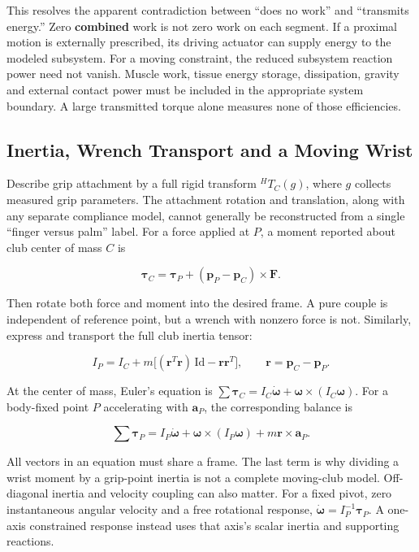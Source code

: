 \documentclass[
  11pt,
]{article}
\begin{document}
This resolves the apparent contradiction between ``does no work'' and
``transmits energy.'' Zero \textbf{combined} work is not zero work on
each segment. If a proximal motion is externally prescribed, its driving
actuator can supply energy to the modeled subsystem. For a moving
constraint, the reduced subsystem reaction power need not vanish. Muscle
work, tissue energy storage, dissipation, gravity and external contact
power must be included in the appropriate system boundary. A large
transmitted torque alone measures none of those efficiencies.

\subsection{Inertia, Wrench Transport and a Moving
Wrist}\label{inertia-wrench-transport-and-a-moving-wrist}

Describe grip attachment by a full rigid transform \({}^{H}T_C(g)\),
where \(g\) collects measured grip parameters. The attachment rotation
and translation, along with any separate compliance model, cannot
generally be reconstructed from a single ``finger versus palm'' label.
For a force applied at \(P\), a moment reported about club center of
mass \(C\) is

\[
\boldsymbol\tau_C=\boldsymbol\tau_P+
(\mathbf p_P-\mathbf p_C)\times\mathbf F.
\]

Then rotate both force and moment into the desired frame. A pure couple
is independent of reference point, but a wrench with nonzero force is
not. Similarly, express and transport the full club inertia tensor:

\[
I_P=I_C+m\big[(\mathbf r^T\mathbf r)\,\mathrm{Id}
-\mathbf r\mathbf r^T\big],\qquad
\mathbf r=\mathbf p_C-\mathbf p_P.
\]

At the center of mass, Euler's equation is
\(\sum\boldsymbol\tau_C=I_C\dot{\boldsymbol\omega}
+\boldsymbol\omega\times(I_C\boldsymbol\omega)\). For a body-fixed point
\(P\) accelerating with \(\mathbf a_P\), the corresponding balance is

\[
\sum\boldsymbol\tau_P
=I_P\dot{\boldsymbol\omega}
+\boldsymbol\omega\times(I_P\boldsymbol\omega)
+m\mathbf r\times\mathbf a_P.
\]

All vectors in an equation must share a frame. The last term is why
dividing a wrist moment by a grip-point inertia is not a complete
moving-club model. Off-diagonal inertia and velocity coupling can also
matter. For a fixed pivot, zero instantaneous angular velocity and a
free rotational response,
\(\dot{\boldsymbol\omega}=I_P^{-1}\boldsymbol\tau_P\). A one-axis
constrained response instead uses that axis's scalar inertia and
supporting reactions.
\end{document}

